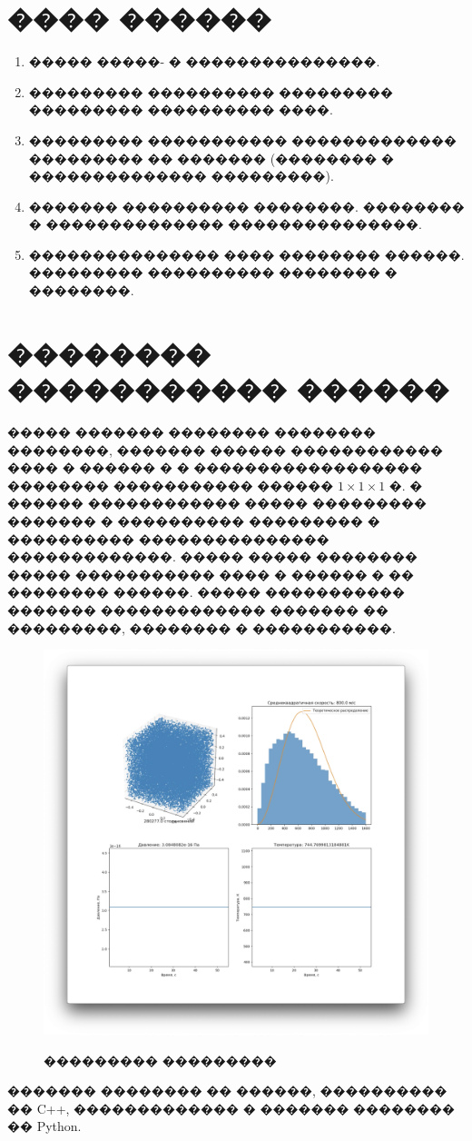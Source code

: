 \section{���� ������}

\begin{enumerate}
    \item ����� �����- � ���������������.
    \item ��������� ���������� ��������� ��������� ���������� ����.
    \item ��������� ����������� ������������� ��������� �� ������� (�������� � �������������� ���������).
    \item ������� ���������� ��������. �������� � �������������� ���������������.
    \item ��������������� ���� �������� ������. ��������� ���������� �������� � ��������.
\end{enumerate}

\section{�������� ����������� ������}

\indent ����� ������� �������� �������� ��������, ������� ������ ������������ ���� � ������ � � ������������������ �������� ����������� ������ $1 \times 1 \times 1$ �.
� ������ ������������ ����� ��������� ������� � ���������� ��������� � ���������� ��������������� �������������. ����� ����� �������� �����
����������� ���� � ������ � �� �������� ������. ����� ����������� ������� ������������� ������� �� ���������, �������� � �����������.
\begin{figure}[!h]
{\includegraphics[width=1\linewidth]{ui.png}}
    \caption{��������� ���������}
\end{figure}
������� �������� �� ������, ���������� �� C++, ������������� � ������� �������� �� Python.


